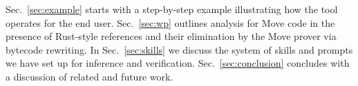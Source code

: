 Sec.~\ref{sec:example} starts with a step-by-step example illustrating how the tool operates for the end user.
Sec.~\ref{sec:wp} outlines \WP analysis for Move code in the presence of Rust-style references and their elimination by the Move prover via bytecode rewriting.
In Sec.~\ref{sec:skills} we discuss the system of skills and prompts we have set up for inference and verification.
Sec.~\ref{sec:conclusion} concludes with a discussion of related and future work.


